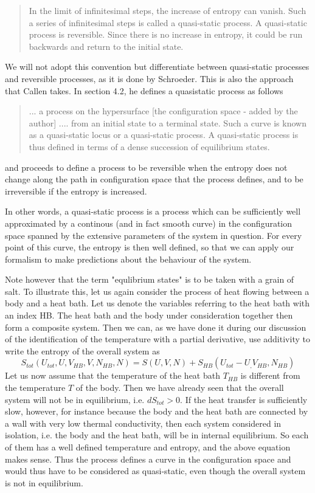 \documentclass[a4paper, draft]{article}
\theoremstyle{own}
\theoremstyle{remark}
\begin{document}
\begin{quote}
In the limit of infinitesimal steps, the increase of entropy can vanish. Such a series of infinitesimal steps is called a quasi-static process. A quasi-static process is reversible. Since there is no increase in entropy, it could be run backwards and return to the initial state.
\end{quote}

We will not adopt this convention but differentiate between quasi-static processes and reversible processes, as it is done by Schroeder. This is also the approach that Callen takes. In \cite{Callen} section 4.2, he defines a quasistatic process as follows 

\begin{quote}
... a process on the hypersurface [the configuration space - added by the author] .... from an initial state to a terminal state. Such a curve is known as a quasi-static locus or a quasi-static process. A quasi-static process is thus defined in terms of a dense succession of equilibrium states.
\end{quote}

and proceeds to define a process to be reversible when the entropy does not change along the path in configuration space that the process defines, and to be irreversible if the entropy is increased.

In other words, a quasi-static process is a process which can be sufficiently well approximated by a continous (and in fact smooth curve) in the configuration space spanned by the extensive parameters of the system in question. For every point of this curve, the entropy is then well defined, so that we can apply our formalism to make predictions about the behaviour of the system.

Note however that the term "equlibrium states" is to be taken with a grain of salt. To illustrate this, let us again consider the process of heat flowing between a body and a heat bath. Let us denote the variables referring to the heat bath with an index HB. The heat bath and the body under consideration together then form a composite system. Then we can, as we have done it during our discussion of the identification of the temperature with a partial derivative, use additivity to write the entropy of the overall system as
$$
S_{tot}(U_{tot}, U, V_{HB}, V, N_{HB}, N) = S(U, V, N) + S_{HB}(U_{tot} - U_, V_{HB}, N_{HB})
$$
Let us now assume that the temperature of the heat bath $T_{HB}$ is different from the temperature $T$ of the body. Then we have already seen that the overall system will not be in equilibrium, i.e. $dS_{tot} > 0$. If the heat transfer is sufficiently slow, however, for instance because the body and the heat bath are connected by a wall with very low thermal conductivity, then each system considered in isolation, i.e. the body and the heat bath, will be in internal equilibrium. So each of them has a well defined temperature and entropy, and the above equation makes sense. Thus the process defines a curve in the configuration space and would thus have to be considered as quasi-static, even though the overall system is not in equilibrium.
\end{document}
